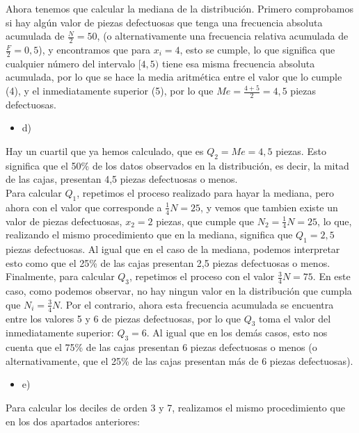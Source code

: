 \documentclass[a4paper,12pt]{article}
\begin{document}
    Ahora tenemos que calcular la mediana de la distribución. Primero comprobamos si hay algún valor de piezas defectuosas que tenga una frecuencia absoluta acumulada de $\frac {N}{2} = 50$, (o alternativamente una frecuencia relativa acumulada de $\frac{F}{2} = 0,5$), y encontramos que para $x_i = 4$, esto se cumple, lo que significa que cualquier número del intervalo $[4,5)$ tiene esa misma frecuencia absoluta acumulada, por lo que se hace la media aritmética entre el valor que lo cumple (4), y el inmediatamente superior (5), por lo que $Me= \frac{4+5}{2} = 4,5$ piezas defectuosas.

\begin {itemize}
    \item [d)]  
\end {itemize}

Hay un cuartil que ya hemos calculado, que es $Q_2 = Me = 4,5$ piezas. Esto significa que el 50\% de los datos observados en la distribución, es decir, la mitad de las cajas, presentan 4,5 piezas defectuosas o menos. \\
Para calcular $Q_1$, repetimos el proceso realizado para hayar la mediana, pero ahora con el valor que corresponde a $\frac{1}{4}N=25$, y vemos que tambien existe un valor de piezas defectuosas, $x_2 = 2$ piezas, que cumple que $N_2 = \frac{1}{4}N = 25$, lo que, realizando el mismo procedimiento que en la mediana, significa que $Q_1=2,5$ piezas defectuosas. Al igual que en el caso de la mediana, podemos interpretar esto como que el 25\% de las cajas presentan 2,5 piezas defectuosas o menos.\\
Finalmente, para calcular $Q_3$, repetimos el proceso con el valor $\frac{3}{4}N = 75$. En este caso, como podemos observar, no hay ningun valor en la distribución que cumpla que $N_i = \frac{3}{4}N$. Por el contrario, ahora esta frecuencia acumulada se encuentra entre los valores 5 y 6 de piezas defectuosas, por lo que $Q_3$ toma el valor del inmediatamente superior: $Q_3= 6$. Al igual que en los demás casos, esto nos cuenta que el 75\% de las cajas presentan 6 piezas defectuosas o menos (o alternativamente, que el 25\% de las cajas presentan más de 6 piezas defectuosas). \\

\begin {itemize}
    \item [e)]  
\end {itemize}

Para calcular los deciles de orden 3 y 7, realizamos el mismo procedimiento que en los dos apartados anteriores:\\
\end{document}
